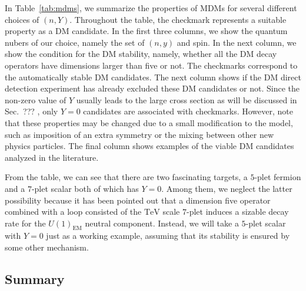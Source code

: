 \documentclass[12pt,twoside,book]{article}
\begin{document}
In Table~\ref{tab:mdms}, we summarize the properties of MDMs for several different choices of $(n, Y)$.
Throughout the table, the checkmark represents a suitable property as a DM candidate.
In the first three columns, we show the quantum nubers of our choice, namely the set of $(n,y)$ and spin.
In the next column, we show the condition for the DM stability, namely, whether all the DM decay operators have dimensions larger than five or not.
The checkmarks correspond to the automatically stable DM candidates.
The next column shows if the DM direct detection experiment has already excluded these DM candidates or not.
Since the non-zero value of $Y$ usually leads to the large cross section as will be discussed in Sec.~??? , only $Y=0$ candidates are associated with checkmarks.
However, note that these properties may be changed due to a small modification to the model, such as imposition of an extra symmetry or the mixing between other new physics particles.
The final column shows examples of the viable DM candidates analyzed in the literature.

From the table, we can see that there are two fascinating targets, a $5$-plet fermion and a $7$-plet scalar both of which has $Y=0$.
Among them, we neglect the latter possibility because it has been pointed out \cite{DiLuzio:2015oha, DelNobile:2015bqo} that a dimension five operator combined with a loop consisted of the $\mathrm{TeV}$ scale $7$-plet induces a sizable decay rate for the $U(1)_{\mathrm{EM}}$ neutral component.
Instead, we will take a $5$-plet scalar with $Y=0$ just as a working example, assuming that its stability is ensured by some other mechanism.


\subsection{Summary}
\end{document}
